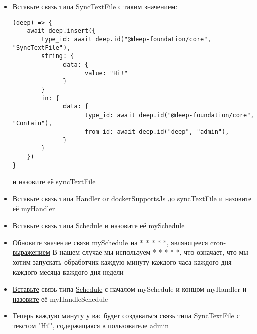 \documentclass{article}
\begin{document}
\begin{itemize}
      \item \hyperlink{DeepCase.InsertLink.Description}{Вставьте} связь типа
            \hyperlink{Core.SyncTextFile.Description}{SyncTextFile} с таким
            значением:
            \begin{lstlisting}
(deep) => {
    await deep.insert({
        type_id: await deep.id("@deep-foundation/core", "SyncTextFile"),
        string: {
              data: {
                    value: "Hi!"
              }
        }
        in: {
              data: {
                    type_id: await deep.id("@deep-foundation/core", "Contain"),
                    from_id: await deep.id("deep", "admin"),
              }
        }
    })
}
    \end{lstlisting}
            и \hyperlink{FAQ.HowToSetName}{назовите} её syncTextFile
      \item \hyperlink{DeepCase.InsertLink.Description}{Вставьте} связь типа
            \hyperlink{Core.Handler.Description}{Handler} от
            \hyperlink{Core.dockerSupportsJs.Description}{dockerSupportsJs}
            до syncTextFile и \hyperlink{FAQ.HowToSetName}{назовите} её
            myHandler
      \item \hyperlink{DeepCase.InsertLink.Description}{Вставьте} связь
            типа \hyperlink{Core.Schedule.Description}{Schedule} и
            \hyperlink{FAQ.HowToSetName}{назовите} её mySchedule
      \item \hyperlink{DeepCase.UpdateLink.Description}{Обновите}
            значение связи mySchedule на
            \hyperlink{Handler.Schedule.CronExpression.Description}{* * * * *,
                  являющееся
                  cron-выражением}
            В нашем случае мы используем * * * * *, что означает, что мы хотим
            запускать обработчик каждую минуту каждого часа каждого дня каждого
            месяца
            каждого дня недели
      \item \hyperlink{DeepCase.InsertLink.Description}{Вставьте} связь
            типа \hyperlink{Core.HandleSchedule.Description}{Schedule} с
            началом mySchedule
            и концом myHandler	и \hyperlink{FAQ.HowToSetName}{назовите} её
            myHandleSchedule
      \item Теперь каждую минуту у вас будет создаваться связь типа
            \hyperlink{Core.SyncTextFile.Description}{SyncTextFile} с текстом
            "Hi!",
            содержащаяся в пользователе admin
\end{itemize}
\end{document}
